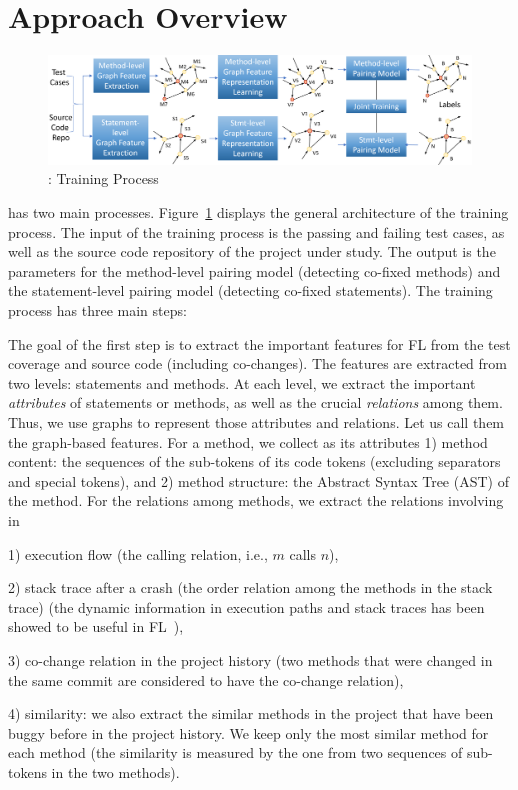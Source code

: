\section{Approach Overview}
\label{overview:sec}

\begin{figure}[t]
	\centering
	\includegraphics[width=5.6in]{graphs/overview.png}
	\caption{{\tool}: Training Process}
	\label{train-overview}
\end{figure}

{\tool} has two main processes. Figure~\ref{train-overview} displays
the general architecture of the training process. The input of the
training process is the passing and failing test cases, as well as the
source code repository of the project under study. The output is the
parameters for the method-level pairing model (detecting co-fixed
methods) and the statement-level pairing model (detecting co-fixed
statements). The training process has three main steps:

The goal of the first step is to extract the important features for FL
from the test coverage and source code (including co-changes). The
features are extracted from two levels: statements and methods. At
each level, we extract the important {\em attributes} of statements or
methods, as well as the crucial {\em relations} among them. Thus, we
use graphs to represent those attributes and relations. Let us call
them the graph-based features. For a method, we collect as its
attributes 1) method content: the sequences of the sub-tokens of its
code tokens (excluding separators and special tokens), and 2) method
structure: the Abstract Syntax Tree (AST) of the method. For the
relations among methods, we extract the relations involving in

1) execution flow (the calling relation, i.e., $m$ calls $n$),

2) stack trace after a crash (the order relation among the methods in
the stack trace) (the dynamic information in execution paths and stack
traces has been showed to be useful in FL~\cite{icse21-fl,DeepFL}),

3) co-change relation in the project history (two methods that were
changed in the same commit are considered to have the co-change
relation),

4) similarity: we also extract the similar methods in the project that
have been buggy before in the project history. We keep only the most
similar method for each method (the similarity is measured by the one
from two sequences of sub-tokens in the two methods).


